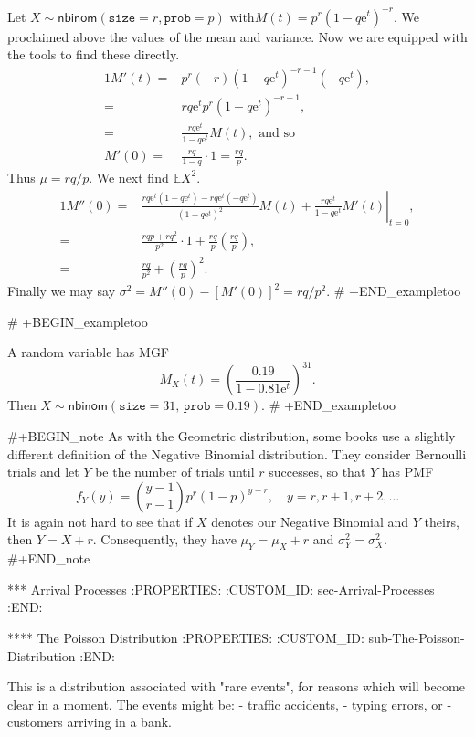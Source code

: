 {Let \(X\sim\mathsf{nbinom}(\mathtt{size}=r,\mathtt{prob}=p)\mbox{ with
$M(t)=p^{r}(1-q\mathrm{e}^{t})^{-r}$}\). We proclaimed above the
values of the mean and variance. Now we are equipped with the tools to
find these directly.
\begin{alignat*}{1}
M'(t)= & p^{r}(-r)(1-q\mathrm{e}^{t})^{-r-1}(-q\mathrm{e}^{t}),\\
= & rq\mathrm{e}^{t}p^{r}(1-q\mathrm{e}^{t})^{-r-1},\\
= & \frac{rq\mathrm{e}^{t}}{1-q\mathrm{e}^{t}}M(t),\mbox{ and so }\\
M'(0)= & \frac{rq}{1-q}\cdot1=\frac{rq}{p}.
\end{alignat*}
Thus \(\mu=rq/p\). We next find \(\mathbb{E} X^{2}\).
\begin{alignat*}{1}
M''(0)= & \left.\frac{rq\mathrm{e}^{t}(1-q\mathrm{e}^{t})-rq\mathrm{e}^{t}(-q\mathrm{e}^{t})}{(1-q\mathrm{e}^{t})^{2}}M(t)+\frac{rq\mathrm{e}^{t}}{1-q\mathrm{e}^{t}}M'(t)\right|_{t=0},\\
= & \frac{rqp+rq^{2}}{p^{2}}\cdot1+\frac{rq}{p}\left(\frac{rq}{p}\right),\\
= & \frac{rq}{p^{2}}+\left(\frac{rq}{p}\right)^{2}.
\end{alignat*}
Finally we may say \( \sigma^{2} = M''(0) - [M'(0)]^{2} = rq/p^{2}. \)
# +END_exampletoo

# +BEGIN_exampletoo

A random variable has MGF
\[
M_{X}(t)=\left(\frac{0.19}{1-0.81\mathrm{e}^{t}}\right)^{31}.
\]
Then \(X\sim\mathsf{nbinom}(\mathtt{size}=31,\,\mathtt{prob}=0.19)\).
# +END_exampletoo


#+BEGIN_note
As with the Geometric distribution, some books use a slightly
different definition of the Negative Binomial distribution. They
consider Bernoulli trials and let \(Y\) be the number of trials until
\(r\) successes, so that \(Y\) has PMF
\begin{equation}
f_{Y}(y)={y-1 \choose r-1}p^{r}(1-p)^{y-r},\quad y=r,r+1,r+2,\ldots
\end{equation}
It is again not hard to see that if \(X\) denotes our Negative
Binomial and \(Y\) theirs, then \(Y=X+r\). Consequently, they have
\(\mu_{Y}=\mu_{X}+r\) and \(\sigma_{Y}^{2}=\sigma_{X}^{2}\).
#+END_note

*** Arrival Processes
:PROPERTIES:
:CUSTOM_ID: sec-Arrival-Processes
:END:

**** The Poisson Distribution
:PROPERTIES:
:CUSTOM_ID: sub-The-Poisson-Distribution
:END:

This is a distribution associated with "rare events", for reasons
which will become clear in a moment. The events might be:
- traffic accidents,
- typing errors, or
- customers arriving in a bank.

}
